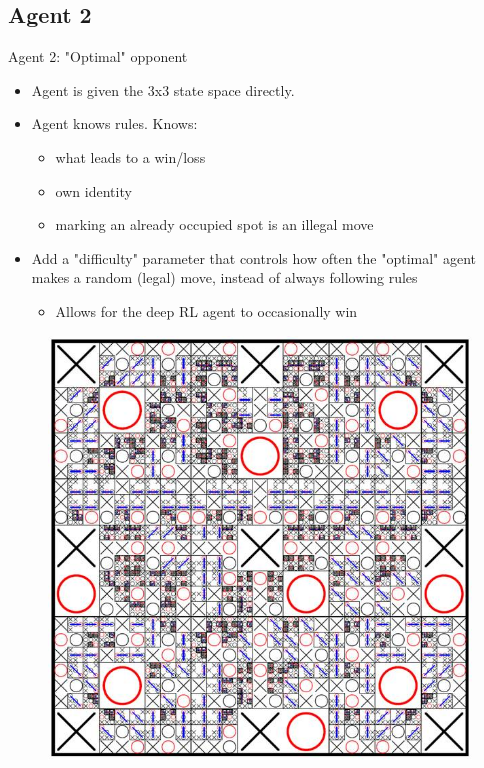 \documentclass[11pt]{beamer}
\begin{document}
\subsection{Agent 2}
\begin{frame}{Agent 2: "Optimal" opponent}	
	\begin{minipage}[t]{0.55\linewidth}
		\begin{itemize}
			\item Agent is given the 3x3 state space directly.
			\item Agent knows rules. Knows:
			\begin{itemize}
				\item what leads to a win/loss
				\item own identity
				\item marking an already occupied spot is an illegal move
			\end{itemize}
			\item Add a "difficulty" parameter that controls how often the "optimal" agent makes a random (legal) move, instead of always following rules
			\begin{itemize}
				\item Allows for the deep RL agent to occasionally win
			\end{itemize}	
		\end{itemize}
	\end{minipage}
	\hfill
	\begin{minipage}[t]{0.4\linewidth}
		\centering
		\begin{figure}[tttAI]
			\centering
			\includegraphics[width=.95\textwidth]{Figures/tttAI.jpg}
		\end{figure}
	\end{minipage}
\end{frame}
\end{document}
